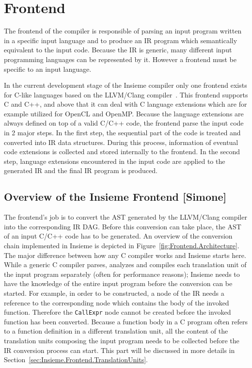 \section{Frontend}
\label{sec:Insieme.Frontend}

The frontend of the compiler is responsible of parsing an input program written
in a specific input language and to produce an IR program which semantically
equivalent to the input code. Because the IR is generic, many different input
programming languages can be represented by it. However a frontend must be
specific to an input language.

In the current development stage of the Insieme compiler only one frontend
exists for C-like languages based on the LLVM/Clang compiler~\cite{clang}. This
frontend supports C and C++, and above that it can deal with C language
extensions which are for example utilized for OpenCL and OpenMP. Because the
language extensions are always defined on top of a valid C/C++ code, the frontend
parse the input code in 2 major steps. In the first step, the sequential part of
the code is treated and converted into IR data structures. During this process,
information of eventual code extensions is collected and stored internally to
the frontend. In the second step, language extensions encountered in the input
code are applied to the generated IR and the final IR program is produced.  

\subsection{Overview of the Insieme Frontend [Simone]}
\label{sec:Insieme.Frontend.Overview}

The frontend's job is to convert the AST generated by the LLVM/Clang compiler
into the corresponding IR DAG. Before this conversion can take place, the AST of
an input C/C++ code has to be generated. An overview of the conversion chain
implemented in Insieme is depicted in Figure~\ref{fig:Frontend.Architecture}.
The major difference between how any C compiler works and Insieme starts here.
While a generic C compiler parses, analyzes and compiles each translation unit
of the input program separately (often for performance reasons); Insieme needs
to have the knowledge of the entire input program before the conversion can be
started. For example, in order to be constructed, a  node of
the IR needs a reference to the corresponding  node which
contains the body of the invoked function.  Therefore the \texttt{CallExpr} node
cannot be created before the invoked function has been converted. Because a
function body in a C program often refers to a function definition in a
different translation unit, all the content of the translation units composing
the input program needs to be collected before the IR conversion process can
start.  This part will be discussed in more details in
Section~\ref{sec:Insieme.Frontend.TranslationUnits}.

